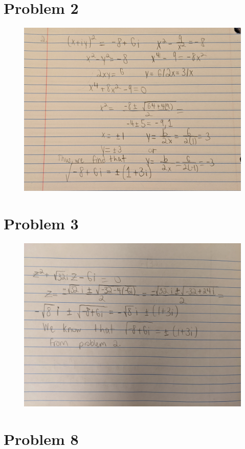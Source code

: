 \documentclass[12pt]{article}
\begin{document}
\section*{Problem 2}
\begin{figure}[H]
\centering
\includegraphics[width=\textwidth]{2}
\end{figure}
\newpage
\section*{Problem 3}
\begin{figure}[H]
\centering
\includegraphics[width=\textwidth]{3}
\end{figure}
\newpage
\section*{Problem 8}
\end{document}
